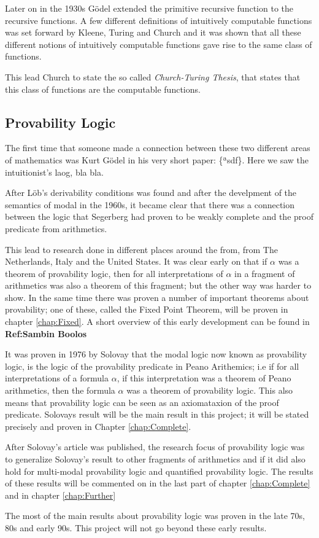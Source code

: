 \documentclass[../main.tex]{subfiles}
\begin{document}
Later on in the 1930s Gödel extended the primitive recursive function to the  recursive
functions. A few different definitions of intuitively computable functions was
set forward by Kleene, Turing and Church and it was shown that all these
different notions of intuitively computable functions gave rise to the same
class of functions.

This lead Church to state the so called \textit{Church-Turing Thesis}, that
states that this class of functions are the computable functions.


\subsection{Provability Logic}
The first time that someone made a connection between these two different areas
of mathematics was Kurt Gödel in his very short  paper: \{ªsdf\}. Here we saw
the intuitionist's laog, bla bla.

After Löb's derivability conditions was found and after the develpment of the
semantics of modal in the 1960s, it became clear that there was a connection
between the logic that Segerberg had proven to be weakly complete and the proof
predicate from arithmetics.

This lead to research done in different places around the from, from The
Netherlands, Italy and the United States. It was clear early on that if
$\alpha$ was a theorem of provability logic, then for all interpretations of
$\alpha$ in a fragment of arithmetics was also a theorem of this fragment; but
the other way was harder to show. In the same time there was proven a number of
important theorems about provability; one of these, called the Fixed Point
Theorem,  will be proven in chapter
\ref{chap:Fixed}.
A short overview of this early
development can be found in \textbf{Ref:Sambin Boolos}

It was proven in 1976 by Solovay that the modal
logic now known as provability logic, is the logic of the provability predicate
in Peano Arithemics; i.e if for all interpretations
of a formula $\alpha$, if this interpretation was a theorem of Peano
arithmetics,
then the formula $\alpha$ was a theorem of provability logic. This also means that
provability logic can be seen as an axiomataxion of the proof predicate.
Solovays result will be the main result in this project; it will be stated
precisely and proven in Chapter \ref{chap:Complete}.

After Solovay's article was published, the research focus of provability logic
was to generalize Solovay's result to other fragments of arithmetics and if
it did also hold for multi-modal provability logic and quantified provability
logic. The results of these results will be commented on in the last part of
chapter \ref{chap:Complete} and in chapter \ref{chap:Further}

The most of the main results about provability logic was proven in the late
70s, 80s and early 90s. This project will not go beyond these early results.
\end{document}
